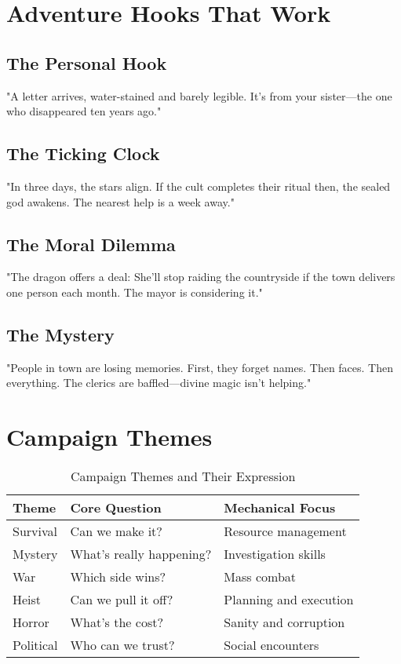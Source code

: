 \documentclass[11pt,letterpaper,openany]{book}
\begin{document}
\section{Adventure Hooks That Work}

\subsection{The Personal Hook}
"A letter arrives, water-stained and barely legible. It's from your sister—the one who disappeared ten years ago."

\subsection{The Ticking Clock}
"In three days, the stars align. If the cult completes their ritual then, the sealed god awakens. The nearest help is a week away."

\subsection{The Moral Dilemma}
"The dragon offers a deal: She'll stop raiding the countryside if the town delivers one person each month. The mayor is considering it."

\subsection{The Mystery}
"People in town are losing memories. First, they forget names. Then faces. Then everything. The clerics are baffled—divine magic isn't helping."

\section{Campaign Themes}

\begin{table}[h]
\centering
\begin{tabular}{@{}lll@{}}
\toprule
\textbf{Theme} & \textbf{Core Question} & \textbf{Mechanical Focus} \\
\midrule
Survival & Can we make it? & Resource management \\
Mystery & What's really happening? & Investigation skills \\
War & Which side wins? & Mass combat \\
Heist & Can we pull it off? & Planning and execution \\
Horror & What's the cost? & Sanity and corruption \\
Political & Who can we trust? & Social encounters \\
\bottomrule
\end{tabular}
\caption{Campaign Themes and Their Expression}
\end{table}
\end{document}
